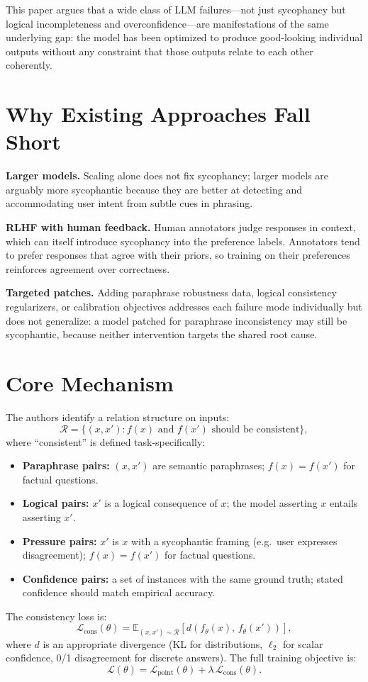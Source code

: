 \documentclass[10pt,twocolumn]{article}
\begin{document}
This paper argues that a wide class of LLM failures---not just sycophancy but logical
incompleteness and overconfidence---are manifestations of the same underlying gap:
the model has been optimized to produce good-looking individual outputs without any
constraint that those outputs relate to each other coherently.

\section{Why Existing Approaches Fall Short}

\textbf{Larger models.} Scaling alone does not fix sycophancy; larger models are
arguably more sycophantic because they are better at detecting and accommodating
user intent from subtle cues in phrasing.

\textbf{RLHF with human feedback.} Human annotators judge responses in context,
which can itself introduce sycophancy into the preference labels. Annotators tend to
prefer responses that agree with their priors, so training on their preferences
reinforces agreement over correctness.

\textbf{Targeted patches.} Adding paraphrase robustness data, logical consistency
regularizers, or calibration objectives addresses each failure mode individually
but does not generalize: a model patched for paraphrase inconsistency may still be
sycophantic, because neither intervention targets the shared root cause.

\section{Core Mechanism}

The authors identify a relation structure on inputs:
\[
\mathcal{R} = \{(x, x') : f(x) \text{ and } f(x') \text{ should be consistent}\},
\]
where ``consistent'' is defined task-specifically:
\begin{itemize}[itemsep=2pt,parsep=0pt]
  \item \textbf{Paraphrase pairs:} $(x, x')$ are semantic paraphrases;
    $f(x) = f(x')$ for factual questions.
  \item \textbf{Logical pairs:} $x'$ is a logical consequence of $x$;
    the model asserting $x$ entails asserting $x'$.
  \item \textbf{Pressure pairs:} $x'$ is $x$ with a sycophantic framing
    (e.g.\ user expresses disagreement); $f(x) = f(x')$ for factual questions.
  \item \textbf{Confidence pairs:} a set of instances with the same ground truth;
    stated confidence should match empirical accuracy.
\end{itemize}
The consistency loss is:
\[
\mathcal{L}_{\mathrm{cons}}(\theta)
= \mathbb{E}_{(x,x') \sim \mathcal{R}}\!\left[d(f_\theta(x),\, f_\theta(x'))\right],
\]
where $d$ is an appropriate divergence (KL for distributions, $\ell_2$ for scalar
confidence, 0/1 disagreement for discrete answers). The full training objective is:
\[
\mathcal{L}(\theta) = \mathcal{L}_{\mathrm{point}}(\theta)
+ \lambda\,\mathcal{L}_{\mathrm{cons}}(\theta).
\]
\end{document}
